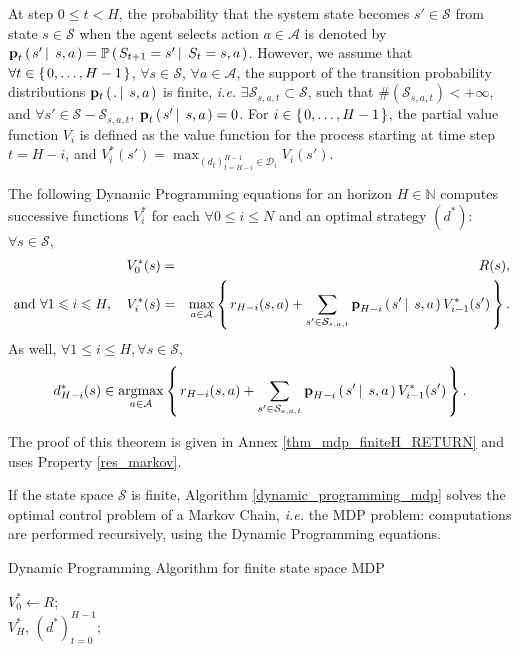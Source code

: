 At step $0 \leqslant t < H$, 
the probability that the system state becomes $s' \in \mathcal{S}$
from state $s \in \mathcal{S}$ when the agent selects action $a \in \mathcal{A}$
is denoted by $\textbf{p}_t \left( \left.  s' \, \right| \left. \, s, a  \right. \right) = \mathbb{P} \left( \left. S_{t+1} = s' \, \right| \left. \, S_t = s, a \right. \right)$.
However, we assume that 
$\forall t \in \left\{ \left. 0, \ldots, H-1 \right. \right\}$,
$\forall s \in \mathcal{S}$, 
$\forall a \in \mathcal{A}$, 
the support of the transition probability distributions 
$\mathbf{p}_t \left( \left.  . \, \right| \left. \, s,a  \right. \right)$ is finite, 
\textit{i.e.} $\exists \mathcal{S}_{s,a,t} \subset \mathcal{S}$, such that
$\# (\mathcal{S}_{s,a,t})< +\infty$, 
and $\forall s' \in \mathcal{S} - \mathcal{S}_{s,a,t}$, 
$\textbf{p}_t \left( \left.  s' \, \right| \left. \, s,a \right. \right)=0$. 
For $i \in \left\{ \left. 0,\ldots,H-1 \right. \right\}$, the partial value function $V_i$
is defined as the value function for the process starting
at time step $t = H-i$, and $\displaystyle V_i^*(s') = \max_{(d_t)_{t=H-i}^{H-1} \in \mathcal{D}_{i}} V_i(s') $.
\begin{theorem}
The following Dynamic Programming equations for an horizon $H \in \mathbb{N}$ 
computes successive functions $V^*_i$ for each $\forall 0 \leqslant i \leqslant N$
and an optimal strategy $(d^*)$: $\forall s \in \mathcal{S}$,
\begin{eqnarray*}
V_0^*(s) & = & R(s),\\
\mbox{ and } \forall 1 \leqslant i \leqslant H, \ \ \ V^*_{i}(s) & = & \max_{a \in \mathcal{A}} \left\{ \left.  r_{H-i}(s,a) 
+ \sum_{s' \in \mathcal{S}_{s,a,t}} \textbf{p}_{H-i} \left( \left.  s' \, \right| \left. \, s,a  \right. \right) V^*_{i-1}(s')  \right. \right\}.
\label{bellman_equation}
\end{eqnarray*}
As well,
$\forall 1 \leqslant i \leqslant H, \forall s \in \mathcal{S},$ 
\begin{eqnarray*}
d^*_{H-i}(s) \in \operatorname*{argmax}_{a \in \mathcal{A}} \left\{ \left.  r_{H-i}(s,a) 
+ \sum_{s' \in \mathcal{S}_{s,a,t}} \textbf{p}_{H-i} \left( \left.  s' \, \right| \left. \, s,a  \right. \right) V^*_{i-1}(s')  \right. \right\}.
\end{eqnarray*}
\label{thm_mdp_finiteH}
\end{theorem}
The proof of this theorem is given in Annex \ref{thm_mdp_finiteH_RETURN} and uses Property \ref{res_markov}.

If the state space $\mathcal{S}$ is finite,
Algorithm \ref{dynamic_programming_mdp} solves
the optimal control problem of a Markov Chain,
\textit{i.e.} the MDP problem:
computations are performed recursively,
using the Dynamic Programming equations.

\begin{algorithm} \caption{Dynamic Programming Algorithm for finite state space MDP} \label{dynamic_programming_mdp}
$V_0^* \gets R$;\\
\Return $V^*_H$, $(d^*)_{t=0}^{H-1}$;
\end{algorithm}


